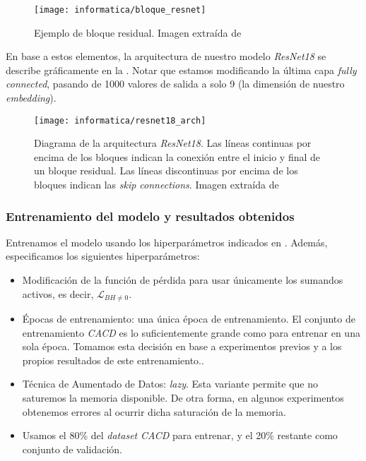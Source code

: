 \begin{figure}[hbt]
    \centering
    \texttt{[image: informatica/bloque\_resnet]}
    \caption{Ejemplo de bloque residual. Imagen extraída de \cite{informatica:resnet_original_paper}}
    \label{img:ejemplo_bloque_resnet}
\end{figure}

En base a estos elementos, la arquitectura de nuestro modelo \textit{ResNet18} se describe gráficamente en la . Notar que estamos modificando la última capa \textit{fully connected}, pasando de 1000 valores de salida a solo 9 (la dimensión de nuestro \textit{embedding}).

\begin{figure}[!hbt]
    \centering
    \texttt{[image: informatica/resnet18\_arch]}
    \caption{Diagrama de la arquitectura \textit{ResNet18}. Las líneas continuas por encima de los bloques indican la conexión entre el inicio y final de un bloque residual. Las líneas discontinuas por encima de los bloques indican las \textit{skip connections}. Imagen extraída de \cite{informatica:resnet18_arch_web}}
    \label{img:arquitectura_resnet_18}
\end{figure}

\subsubsection{Entrenamiento del modelo y resultados obtenidos} \label{isec:entrenamiento_mejor_modelo}

Entrenamos el modelo usando los hiperparámetros indicados en . Además, especificamos los siguientes hiperparámetros:

\begin{itemize}
    \item Modificación de la función de pérdida para usar únicamente los sumandos activos, es decir, $\mathcal{L}_{BH \neq 0}$.
    \item Épocas de entrenamiento: una única época de entrenamiento. El conjunto de entrenamiento \textit{CACD} es lo suficientemente grande como para entrenar en una sola época. Tomamos esta decisión en base a experimentos previos y a los propios resultados de este entrenamiento..
    \item Técnica de Aumentado de Datos: \textit{lazy}. Esta variante permite que no saturemos la memoria disponible. De otra forma, en algunos experimentos obtenemos errores al ocurrir dicha saturación de la memoria.
    \item Usamos el 80\% del \textit{dataset} \textit{CACD} para entrenar, y el 20\% restante como conjunto de validación.
\end{itemize}

